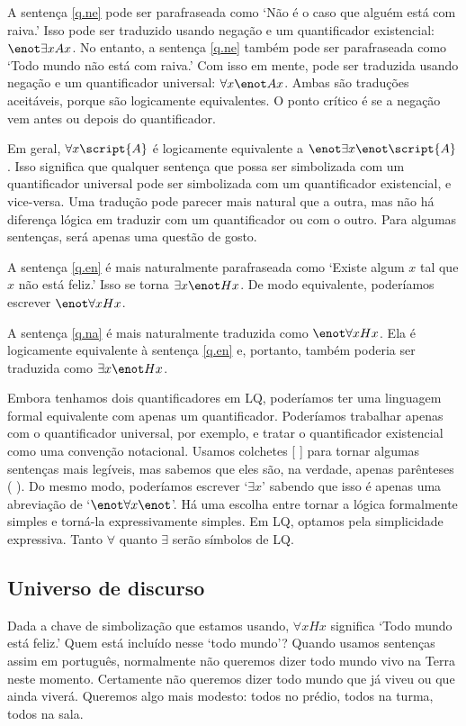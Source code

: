 A sentença \ref{q.ne} pode ser parafraseada como `Não é o caso que alguém está com raiva.' Isso pode ser traduzido usando negação e um quantificador existencial: $\enot \exists x Ax$. No entanto, a sentença \ref{q.ne} também pode ser parafraseada como `Todo mundo não está com raiva.' Com isso em mente, pode ser traduzida usando negação e um quantificador universal: $\forall x \enot Ax$. Ambas são traduções aceitáveis, porque são logicamente equivalentes. O ponto crítico é se a negação vem antes ou depois do quantificador.

Em geral, $\forall x\script{A}$ é logicamente equivalente a $\enot\exists x\enot\script{A}$. Isso significa que qualquer sentença que possa ser simbolizada com um quantificador universal pode ser simbolizada com um quantificador existencial, e vice-versa. Uma tradução pode parecer mais natural que a outra, mas não há diferença lógica em traduzir com um quantificador ou com o outro. Para algumas sentenças, será apenas uma questão de gosto.

A sentença \ref{q.en} é mais naturalmente parafraseada como `Existe algum $x$ tal que $x$ não está feliz.' Isso se torna $\exists x \enot Hx$. De modo equivalente, poderíamos escrever $\enot\forall x Hx$.

A sentença \ref{q.na} é mais naturalmente traduzida como $\enot\forall xHx$. Ela é logicamente equivalente à sentença \ref{q.en} e, portanto, também poderia ser traduzida como $\exists x \enot Hx$.

Embora tenhamos dois quantificadores em LQ, poderíamos ter uma linguagem formal equivalente com apenas um quantificador. Poderíamos trabalhar apenas com o quantificador universal, por exemplo, e tratar o quantificador existencial como uma convenção notacional. Usamos colchetes [ ] para tornar algumas sentenças mais legíveis, mas sabemos que eles são, na verdade, apenas parênteses ( ). Do mesmo modo, poderíamos escrever `$\exists x$' sabendo que isso é apenas uma abreviação de `$\enot \forall x \enot$'. Há uma escolha entre tornar a lógica formalmente simples e torná-la expressivamente simples. Em LQ, optamos pela simplicidade expressiva. Tanto $\forall$ quanto $\exists$ serão símbolos de LQ.


\subsection{Universo de discurso}
Dada a chave de simbolização que estamos usando, $\forall xHx$ significa `Todo mundo está feliz.' Quem está incluído nesse `todo mundo'? Quando usamos sentenças assim em português, normalmente não queremos dizer todo mundo vivo na Terra neste momento. Certamente não queremos dizer todo mundo que já viveu ou que ainda viverá. Queremos algo mais modesto: todos no prédio, todos na turma, todos na sala.

